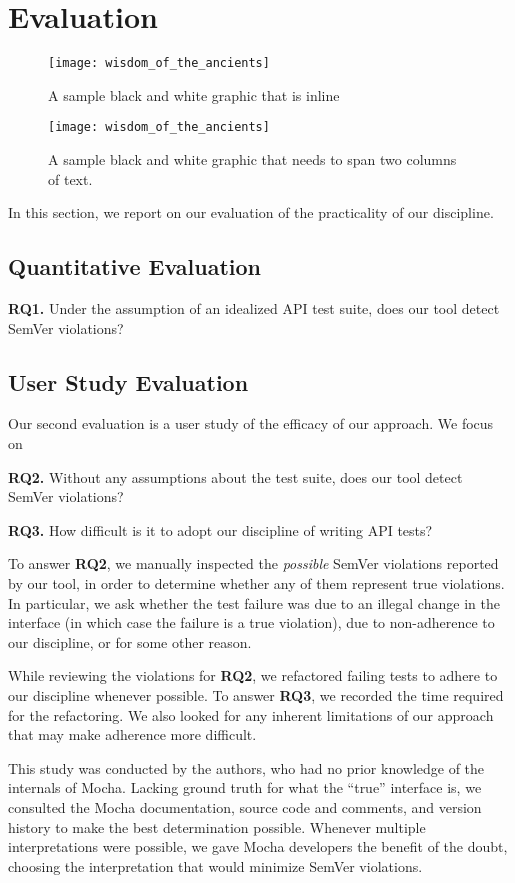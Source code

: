 \section{Evaluation}

\begin{figure}
\centering
\texttt{[image: wisdom\_of\_the\_ancients]}
\caption{A sample black and white graphic
that is inline}
\end{figure}

\begin{figure*}
\centering
\texttt{[image: wisdom\_of\_the\_ancients]}
\caption{A sample black and white graphic
that needs to span two columns of text.}
\end{figure*}

In this section, we report on our evaluation of the practicality of
our discipline. 

\subsection{Quantitative Evaluation}

{\bf RQ1.} Under the assumption of an idealized API test suite, does
our tool detect SemVer violations?

\subsection{User Study Evaluation}
Our second evaluation is a user study of the efficacy of our
approach. We focus on 

{\bf RQ2.} Without any assumptions about the test suite, does our tool
detect SemVer violations?

{\bf RQ3.} How difficult is it to adopt our discipline of writing API
tests?

To answer {\bf RQ2}, we manually inspected the {\em possible} SemVer
violations reported by our tool, in order to determine whether any of
them represent true violations. In particular, we ask whether the test
failure was due to an illegal change in the interface (in which case
the failure is a true violation), due to non-adherence to our
discipline, or for some other reason.

While reviewing the violations for {\bf RQ2}, we refactored failing
tests to adhere to our discipline whenever possible. To answer {\bf
  RQ3}, we recorded the time required for the refactoring. We also
looked for any inherent limitations of our approach that may make
adherence more difficult.

This study was conducted by the authors, who had no prior knowledge of
the internals of Mocha. Lacking ground truth for what the ``true''
interface is, we consulted the Mocha documentation, source code and
comments, and version history to make the best determination
possible. Whenever multiple interpretations were possible, we gave
Mocha developers the benefit of the doubt, choosing the interpretation
that would minimize SemVer violations.

